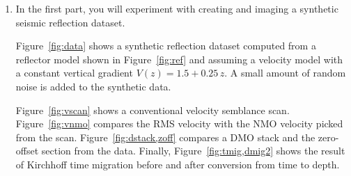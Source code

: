 \begin{enumerate}
\item In the first part, you will experiment with creating and 
  imaging a synthetic seismic reflection dataset.



Figure~\ref{fig:data} shows a synthetic reflection dataset computed
from a reflector model shown in Figure~\ref{fig:ref} and assuming a
velocity model with a constant vertical gradient $V(z) = 1.5 +
0.25\,z$. A small amount of random noise is added to the synthetic data.

Figure~\ref{fig:vscan} shows a conventional velocity semblance
scan. Figure~\ref{fig:vnmo} compares the RMS velocity with the NMO
velocity picked from the scan. Figure~\ref{fig:dstack,zoff} compares a
DMO stack and the zero-offset section from the data. Finally,
Figure~\ref{fig:tmig,dmig2} shows the result of Kirchhoff time
migration before and after conversion from time to depth.


\end{enumerate}
